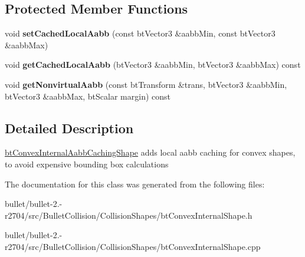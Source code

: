 \subsection*{Protected Member Functions}
\begin{DoxyCompactItemize}
\item 
\hypertarget{classbt_convex_internal_aabb_caching_shape_abb8fcb1198a4698d7d16b2ddfad640ee}{void {\bfseries set\+Cached\+Local\+Aabb} (const bt\+Vector3 \&aabb\+Min, const bt\+Vector3 \&aabb\+Max)}\label{classbt_convex_internal_aabb_caching_shape_abb8fcb1198a4698d7d16b2ddfad640ee}

\item 
\hypertarget{classbt_convex_internal_aabb_caching_shape_a0a506896c9da7632e4d3fde9614f3b36}{void {\bfseries get\+Cached\+Local\+Aabb} (bt\+Vector3 \&aabb\+Min, bt\+Vector3 \&aabb\+Max) const }\label{classbt_convex_internal_aabb_caching_shape_a0a506896c9da7632e4d3fde9614f3b36}

\item 
\hypertarget{classbt_convex_internal_aabb_caching_shape_a6bc89a12113e312d0a97cf684f8a147c}{void {\bfseries get\+Nonvirtual\+Aabb} (const bt\+Transform \&trans, bt\+Vector3 \&aabb\+Min, bt\+Vector3 \&aabb\+Max, bt\+Scalar margin) const }\label{classbt_convex_internal_aabb_caching_shape_a6bc89a12113e312d0a97cf684f8a147c}

\end{DoxyCompactItemize}


\subsection{Detailed Description}
\hyperlink{classbt_convex_internal_aabb_caching_shape}{bt\+Convex\+Internal\+Aabb\+Caching\+Shape} adds local aabb caching for convex shapes, to avoid expensive bounding box calculations 

The documentation for this class was generated from the following files\+:\begin{DoxyCompactItemize}
\item 
bullet/bullet-\/2.-\/r2704/src/\+Bullet\+Collision/\+Collision\+Shapes/bt\+Convex\+Internal\+Shape.\+h\item 
bullet/bullet-\/2.-\/r2704/src/\+Bullet\+Collision/\+Collision\+Shapes/bt\+Convex\+Internal\+Shape.\+cpp\end{DoxyCompactItemize}
